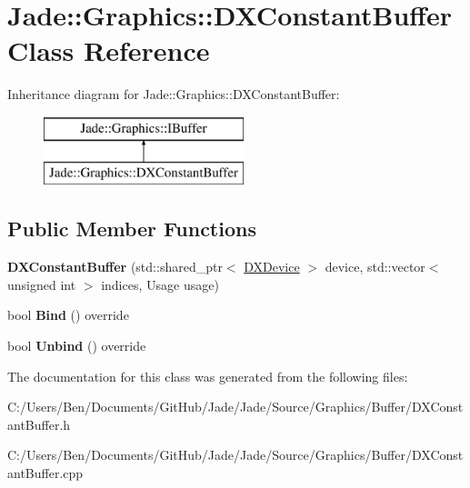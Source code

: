 \hypertarget{class_jade_1_1_graphics_1_1_d_x_constant_buffer}{}\section{Jade\+:\+:Graphics\+:\+:D\+X\+Constant\+Buffer Class Reference}
\label{class_jade_1_1_graphics_1_1_d_x_constant_buffer}
Inheritance diagram for Jade\+:\+:Graphics\+:\+:D\+X\+Constant\+Buffer\+:\begin{figure}[H]
\begin{center}
\leavevmode
\includegraphics[height=2.000000cm]{class_jade_1_1_graphics_1_1_d_x_constant_buffer}
\end{center}
\end{figure}
\subsection*{Public Member Functions}
\begin{DoxyCompactItemize}
\item 
\hypertarget{class_jade_1_1_graphics_1_1_d_x_constant_buffer_a0de29158f2756fa32b47a0efb8c2b4fc}{}{\bfseries D\+X\+Constant\+Buffer} (std\+::shared\+\_\+ptr$<$ \hyperlink{class_jade_1_1_graphics_1_1_d_x_device}{D\+X\+Device} $>$ device, std\+::vector$<$ unsigned int $>$ indices, Usage usage)\label{class_jade_1_1_graphics_1_1_d_x_constant_buffer_a0de29158f2756fa32b47a0efb8c2b4fc}

\item 
\hypertarget{class_jade_1_1_graphics_1_1_d_x_constant_buffer_abe4d09d3b65b1373b964a13331192dcf}{}bool {\bfseries Bind} () override\label{class_jade_1_1_graphics_1_1_d_x_constant_buffer_abe4d09d3b65b1373b964a13331192dcf}

\item 
\hypertarget{class_jade_1_1_graphics_1_1_d_x_constant_buffer_ab8d3677bc84dfcd40621ae383d0de43a}{}bool {\bfseries Unbind} () override\label{class_jade_1_1_graphics_1_1_d_x_constant_buffer_ab8d3677bc84dfcd40621ae383d0de43a}

\end{DoxyCompactItemize}


The documentation for this class was generated from the following files\+:\begin{DoxyCompactItemize}
\item 
C\+:/\+Users/\+Ben/\+Documents/\+Git\+Hub/\+Jade/\+Jade/\+Source/\+Graphics/\+Buffer/D\+X\+Constant\+Buffer.\+h\item 
C\+:/\+Users/\+Ben/\+Documents/\+Git\+Hub/\+Jade/\+Jade/\+Source/\+Graphics/\+Buffer/D\+X\+Constant\+Buffer.\+cpp\end{DoxyCompactItemize}
